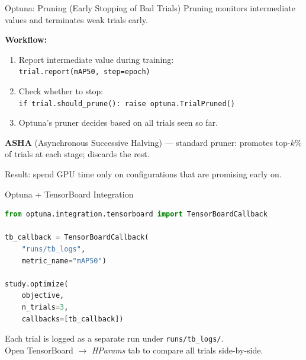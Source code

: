 \documentclass[aspectratio=169]{beamer}
\begin{document}
\begin{frame}[t]{Optuna: Pruning (Early Stopping of Bad Trials)}
Pruning monitors intermediate values and terminates weak trials early.

\vspace{2mm}
\textbf{Workflow:}
\begin{enumerate}
    \item Report intermediate value during training:\\
    \texttt{trial.report(mAP50, step=epoch)}
    \item Check whether to stop:\\
    \texttt{if trial.should\_prune(): raise optuna.TrialPruned()}
    \item Optuna's pruner decides based on all trials seen so far.
\end{enumerate}

\vspace{2mm}
\textbf{ASHA} (Asynchronous Successive Halving) --- standard pruner: promotes top-$k$\% of trials at each stage; discards the rest.
\vspace{1mm}

Result: spend GPU time only on configurations that are promising early on.
\end{frame}

\begin{frame}[t,fragile]{Optuna + TensorBoard Integration}
\vspace*{-0.6cm}
\begin{lstlisting}[language=Python, basicstyle=\footnotesize\ttfamily]
from optuna.integration.tensorboard import TensorBoardCallback

tb_callback = TensorBoardCallback(
    "runs/tb_logs",
    metric_name="mAP50")

study.optimize(
    objective,
    n_trials=3,
    callbacks=[tb_callback])
\end{lstlisting}
\vspace{1mm}
Each trial is logged as a separate run under \texttt{runs/tb\_logs/}.\\Open TensorBoard $\rightarrow$ \textit{HParams} tab to compare all trials side-by-side.
\end{frame}
\end{document}
